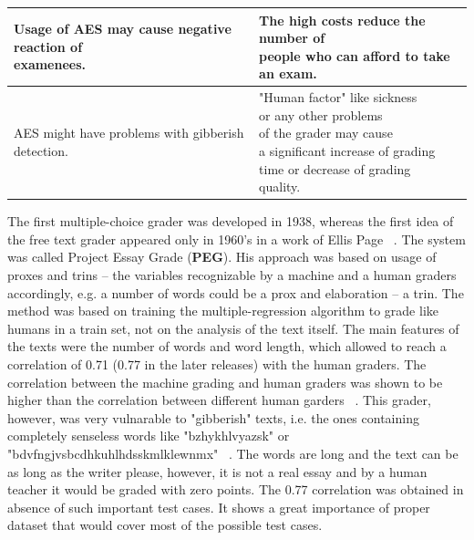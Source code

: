 \documentclass[11pt]{report}
\numberwithin{equation}{section} %
\begin{document}
\begin{table}[]
\begin{tabular}{|l|l|}
  \makecell{Usage of AES may cause negative reaction of \\examenees.} &  \makecell{The high costs reduce the number of\\people who can afford to take an exam.}  \\ \hline
    \makecell{AES might have problems with gibberish\\detection.} &  \makecell{"Human factor" like sickness\\ or any other problems\\of the grader may cause\\a significant increase of grading\\time or decrease of grading\\ quality. }  \\ \hline
\end{tabular}
\end{table}


The first multiple-choice grader was developed in 1938, whereas the first idea of the free text grader appeared only in 1960's in a work of Ellis Page ~\cite{Blood}. The system was called Project Essay Grade (\textbf{PEG}). His approach was based on usage of proxes and trins -- the variables recognizable by a machine and a human graders accordingly, e.g. a number of words could be a prox and elaboration -- a trin. The method was based on training the multiple-regression algorithm to grade like humans in a train set, not on the analysis of the text itself. The main features of the texts were the number of words and word length, which allowed to reach a correlation of 0.71 (0.77 in the later releases) with the human graders. The correlation between the machine grading and human graders was shown to be higher than the correlation between different human garders ~\cite{Blood}. This grader, however, was very vulnarable to "gibberish" texts, i.e. the ones containing completely senseless words like "bzhykhlvyazsk" or "bdvfngjvsbcdhkuhlhdsskmlklewnmx" ~\cite{Shermis}. The words are long and the text can be as long as the writer please, however, it is not a real essay and by a human teacher it would be graded with zero points. The 0.77 correlation was obtained in absence of such important test cases. It shows a great importance of proper dataset that would cover most of the possible test cases. \\
\end{document}

